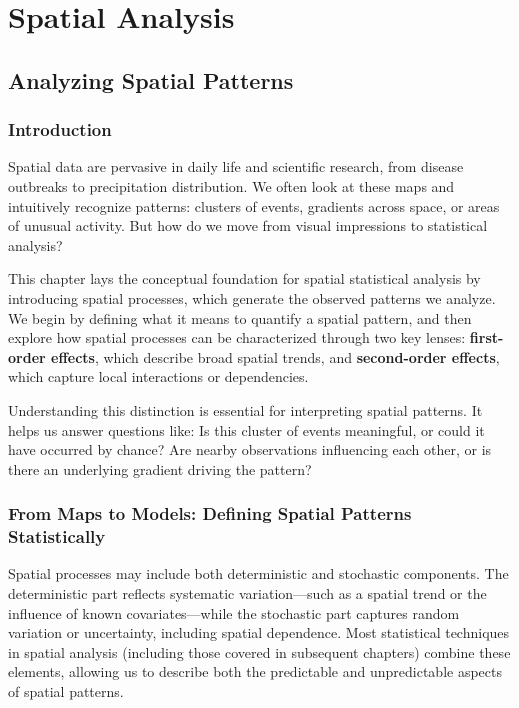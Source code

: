 \documentclass[
  letterpaper,
]{book}
\begin{document}
\part{Spatial Analysis}

\chapter{Analyzing Spatial Patterns}\label{chp11_0}

\section{Introduction}\label{introduction-10}

Spatial data are pervasive in daily life and scientific research, from
disease outbreaks to precipitation distribution. We often look at these
maps and intuitively recognize patterns: clusters of events, gradients
across space, or areas of unusual activity. But how do we move from
visual impressions to statistical analysis?

This chapter lays the conceptual foundation for spatial statistical
analysis by introducing spatial processes, which generate the observed
patterns we analyze. We begin by defining what it means to quantify a
spatial pattern, and then explore how spatial processes can be
characterized through two key lenses: \textbf{first-order effects},
which describe broad spatial trends, and \textbf{second-order effects},
which capture local interactions or dependencies.

Understanding this distinction is essential for interpreting spatial
patterns. It helps us answer questions like: Is this cluster of events
meaningful, or could it have occurred by chance? Are nearby observations
influencing each other, or is there an underlying gradient driving the
pattern?

\section{From Maps to Models: Defining Spatial Patterns
Statistically}\label{from-maps-to-models-defining-spatial-patterns-statistically}

Spatial processes may include both deterministic and stochastic
components. The deterministic part reflects systematic variation---such
as a spatial trend or the influence of known covariates---while the
stochastic part captures random variation or uncertainty, including
spatial dependence. Most statistical techniques in spatial analysis
(including those covered in subsequent chapters) combine these elements,
allowing us to describe both the predictable and unpredictable aspects
of spatial patterns.
\end{document}

